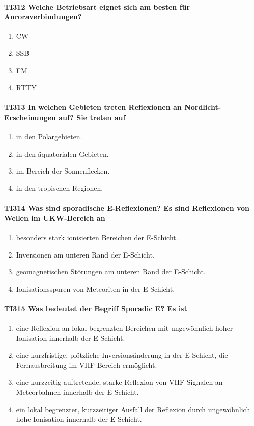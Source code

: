 \documentclass[8pt]{article}
\begin{document}
\paragraph*{TI312 Welche Betriebsart eignet sich am besten für Auroraverbindungen?}
\begin{enumerate}[nolistsep,label=\Alph*]
\item CW
\item SSB
\item FM
\item RTTY
\end{enumerate}

\paragraph*{TI313 In welchen Gebieten treten Reflexionen an Nordlicht-Erscheinungen auf? Sie treten auf}
\begin{enumerate}[nolistsep,label=\Alph*]
\item in den Polargebieten.
\item in den äquatorialen Gebieten.
\item im Bereich der Sonnenflecken.
\item in den tropischen Regionen.
\end{enumerate}

\paragraph*{TI314 Was sind sporadische E-Reflexionen? Es sind Reflexionen von Wellen im UKW-Bereich an}
\begin{enumerate}[nolistsep,label=\Alph*]
\item besonders stark ionisierten Bereichen der E-Schicht.
\item Inversionen am unteren Rand der E-Schicht.
\item geomagnetischen Störungen am unteren Rand der E-Schicht.
\item Ionisationsspuren von Meteoriten in der E-Schicht.
\end{enumerate}

\paragraph*{TI315 Was bedeutet der Begriff \"Sporadic E\"? Es ist}
\begin{enumerate}[nolistsep,label=\Alph*]
\item eine Reflexion an lokal begrenzten Bereichen mit ungewöhnlich hoher Ionisation innerhalb der E-Schicht.
\item eine kurzfristige, plötzliche Inversionsänderung in der E-Schicht, die Fernausbreitung im VHF-Bereich ermöglicht.
\item eine kurzzeitig auftretende, starke Reflexion von VHF-Signalen an Meteorbahnen innerhalb der E-Schicht.
\item ein lokal begrenzter, kurzzeitiger Ausfall der Reflexion durch ungewöhnlich hohe Ionisation innerhalb der E-Schicht.
\end{enumerate}
\end{document}
